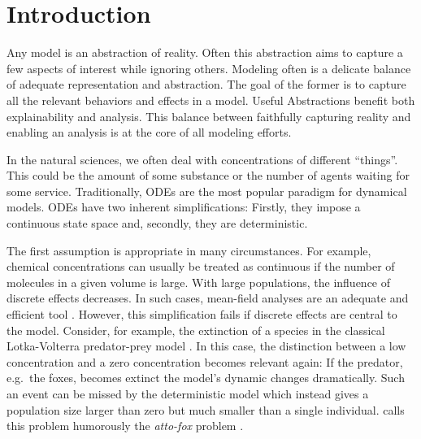 \chapter{Introduction}


Any model is an abstraction of reality.
Often this abstraction aims to capture a few aspects of interest while ignoring others.
Modeling often is a delicate balance of adequate representation and abstraction.
The goal of the former is to capture all the relevant behaviors and effects in a model.
Useful Abstractions benefit both explainability and analysis.
This balance between faithfully capturing reality and enabling an analysis is at the core of all modeling efforts.


In the natural sciences, we often deal with concentrations of different ``things''.
This could be the amount of some substance or the number of agents waiting for some service.
Traditionally, \aclp{ODE} are the most popular paradigm for dynamical models.
\Aclp{ODE} have two inherent simplifications: Firstly, they impose a continuous state space and, secondly, they are deterministic.

The first assumption is appropriate in many circumstances.
For example, chemical concentrations can usually be treated as continuous if the number of molecules in a given volume is large.
With large populations, the influence of discrete effects decreases.
In such cases, mean-field analyses are an adequate and efficient tool \parencite{bortolussi2013continuous}.
However, this simplification fails if discrete effects are central to the model.
Consider, for example, the extinction of a species in the classical Lotka-Volterra predator-prey model \parencite{lotka1925elements}.
In this case, the distinction between a low concentration and a zero concentration becomes relevant again:
If the predator, e.g.\ the foxes, becomes extinct the model's dynamic changes dramatically.
Such an event can be missed by the deterministic model which instead gives a population size larger than zero but much smaller than a single individual.
 calls this problem humorously the \emph{atto-fox} problem \parencite{mollison1991dependence}.

